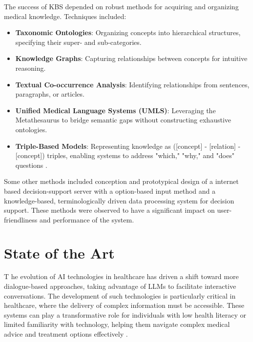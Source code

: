 \noindent The success of KBS depended on robust methods for acquiring and organizing medical knowledge. Techniques included:
\begin{itemize}
    \item \textcolor{TUMRed}{\textbf{Taxonomic Ontologies}}: Organizing concepts into hierarchical structures, specifying their super- and sub-categories.
    \item \textcolor{TUMRed}{\textbf{Knowledge Graphs}}: Capturing relationships between concepts for intuitive reasoning.
    \item \textcolor{TUMRed}{\textbf{Textual Co-occurrence Analysis}}: Identifying relationships from sentences, paragraphs, or articles.
    \item \textcolor{TUMRed}{\textbf{Unified Medical Language Systems (UMLS)}}: Leveraging the Metathesaurus to bridge semantic gaps without constructing exhaustive ontologies.
    \item \textcolor{TUMRed}{\textbf{Triple-Based Models}}: Representing knowledge as ([concept] - [relation] - [concept]) triples, enabling systems to address "which," "why," and "does" questions \cite{demner2009can}.
\end{itemize}

\noindent Some other methods included conception and prototypical design of a internet based decision-support server \cite{eich1999internet} with a option-based input method and a knowledge-based, terminologically driven data processing system for decision support. These methods were observed to have a significant impact on user-friendliness and performance of the system.

\section{State of the Art}
\lettrine{T}{ }he evolution of AI technologies in healthcare has driven a shift toward more dialogue-based approaches, taking advantage of LLMs to facilitate interactive conversations. The development of such technologies is particularly critical in healthcare, where the delivery of complex information must be accessible. These systems can play a transformative role for individuals with low health literacy or limited familiarity with technology, helping them navigate complex medical advice and treatment options effectively \cite{cohen2022intelligent}.\\[\baselineskip]

